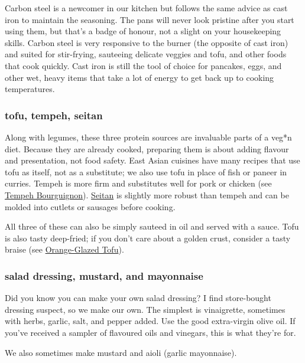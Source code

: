 Carbon steel is a newcomer in our kitchen but follows the same advice as cast iron to maintain the seasoning. The pans will never look pristine after you start using them, but that's a badge of honour, not a slight on your housekeeping skills. Carbon steel is very responsive to the burner (the opposite of cast iron) and suited for stir-frying, sauteeing delicate veggies and tofu, and other foods that cook quickly. Cast iron is still the tool of choice for pancakes, eggs, and other wet, heavy items that take a lot of energy to get back up to cooking temperatures.

\subsubsection{tofu, tempeh, seitan}
Along with legumes, these three protein sources are invaluable parts of a veg*n diet. Because they are already cooked, preparing them is about adding flavour and presentation, not food safety. East Asian cuisines have many recipes that use tofu as itself, not as a substitute; we also use tofu in place of fish or paneer in curries. Tempeh is more firm and substitutes well for pork or chicken (see \hyperref[Tempeh Bourguignon]{Tempeh Bourguignon}). \hyperref[Seitan]{Seitan} is slightly more robust than tempeh and can be molded into cutlets or sausages before cooking.

All three of these can also be simply sauteed in oil and served with a sauce. Tofu is also tasty deep-fried; if you don't care about a golden crust, consider a tasty braise (see \hyperref[Orange-Glazed Tofu]{Orange-Glazed Tofu}).

\subsubsection{salad dressing, mustard, and mayonnaise}
Did you know you can make your own salad dressing? I find store-bought dressing suspect, so we make our own. The simplest is vinaigrette, sometimes with herbs, garlic, salt, and pepper added. Use the good extra-virgin olive oil. If you've received a sampler of flavoured oils and vinegars, this is what they're for.

We also sometimes make mustard and aioli (garlic mayonnaise).

